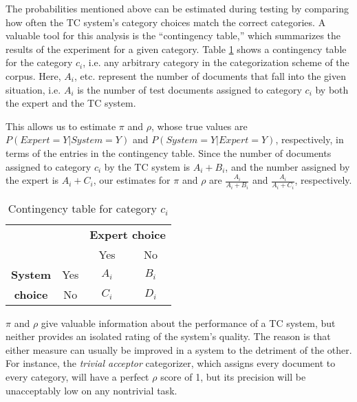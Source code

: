 The probabilities mentioned above can be estimated during testing by
comparing how often the TC system's category choices match the correct
categories.  A valuable tool for this analysis is the ``contingency
table,'' which summarizes the results of the experiment for a given
category.  Table \ref{onecat-contingency} shows a contingency table
for the category $c_i$, i.e. any arbitrary category in the
categorization scheme of the corpus.  Here, $A_i$, etc. represent the
number of documents that fall into the given situation, i.e. $A_i$ is
the number of test documents assigned to category $c_i$ by both the
expert and the TC system.

This allows us to estimate $\pi$ and $\rho$, whose true values are
$P(Expert=Y | System=Y)$ and $P(System=Y | Expert=Y)$, respectively,
in terms of the entries in the contingency table.  Since the number of
documents assigned to category $c_i$ by the TC system is $A_i+B_i$,
and the number assigned by the expert is $A_i+C_i$, our estimates for
$\pi$ and $\rho$ are $\frac{A_i}{A_i + B_i}$ and $\frac{A_i}{A_i +
C_i}$, respectively.



\begin{table}
\begin{center}
\begin{tabular}{|c|c|c|c|}
\cline{3-4}
\multicolumn{2}{c|}{} & \multicolumn{2}{c|}{\textbf{Expert choice}} \\
\cline{3-4}
\multicolumn{2}{c|}{} & Yes & No \\
\hline
\textbf{System} & Yes & $A_i$ & $B_i$ \\
\cline{2-4}
\textbf{choice} & No  & $C_i$ & $D_i$ \\
\hline
\end{tabular}
\end{center}
\caption{Contingency table for category $c_i$}
\label{onecat-contingency}
\end{table}


$\pi$ and $\rho$ give valuable information about the performance of a
TC system, but neither provides an isolated rating of the system's
quality.  The reason is that either measure can usually be improved in
a system to the detriment of the other. \cite[p. 35]{sebastiani:02} For
instance, the \emph{trivial acceptor} categorizer, which assigns every
document to every category, will have a perfect $\rho$ score of 1, but
its precision will be unacceptably low on any nontrivial task.

